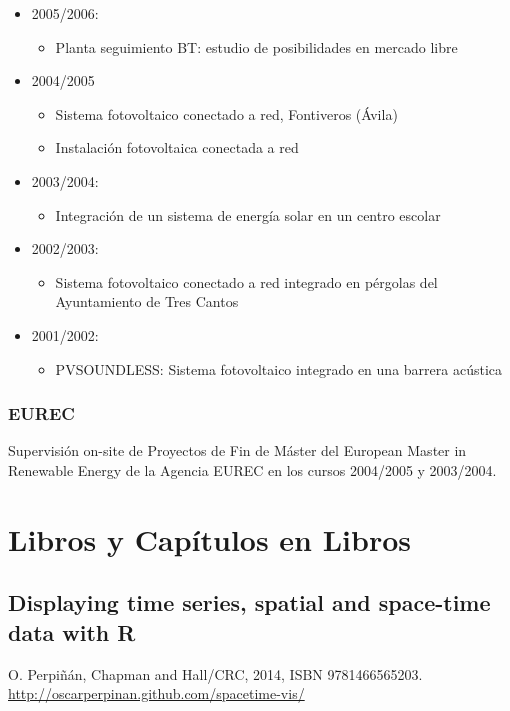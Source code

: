 \documentclass[article, a4paper]{memoir}
\begin{document}
\begin{itemize}
\begin{itemize}
\end{itemize}
\item 2005/2006:
\begin{itemize}
\item \guillemotleft{}Planta seguimiento BT: estudio de posibilidades en mercado libre\guillemotright{}
\end{itemize}
\item 2004/2005
\begin{itemize}
\item \guillemotleft{}Sistema fotovoltaico conectado a red, Fontiveros (Ávila)\guillemotright{}
\item \guillemotleft{}Instalación fotovoltaica conectada a red\guillemotright{}
\end{itemize}
\item 2003/2004:
\begin{itemize}
\item \guillemotleft{}Integración de un sistema de energía solar en un centro escolar\guillemotright{}
\end{itemize}
\item 2002/2003:
\begin{itemize}
\item \guillemotleft{}Sistema fotovoltaico conectado a red integrado en pérgolas del Ayuntamiento de Tres Cantos\guillemotright{}
\end{itemize}
\item 2001/2002:
\begin{itemize}
\item \guillemotleft{}PVSOUNDLESS: Sistema fotovoltaico integrado en una barrera acústica\guillemotright{}
\end{itemize}
\end{itemize}

\subsubsection{EUREC}
\label{sec:org1e1afa0}
Supervisión on-site de Proyectos de Fin de Máster del European Master in Renewable Energy de la Agencia EUREC en los cursos 2004/2005 y 2003/2004.

\section{Libros y Capítulos en Libros}
\label{sec:org4591886}

\subsection{Displaying time series, spatial and space-time data with R}
\label{sec:org692a837}
O. Perpiñán, Chapman and Hall/CRC, 2014, ISBN 9781466565203. \url{http://oscarperpinan.github.com/spacetime-vis/}
\end{document}
